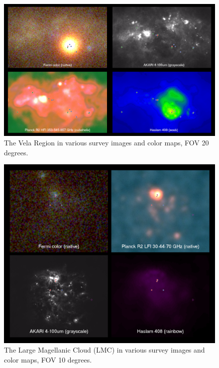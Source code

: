 \begin{figure}[tb]
  \centerline{\includegraphics[width=\textwidth]{figures/vela_region}}
  \caption{The Vela Region in various survey images and color maps, FOV 20 degrees.}
\end{figure}



\begin{figure}[tb]
  \centerline{\includegraphics[width=\textwidth]{figures/lmc_region}}
  \caption{The Large Magellanic Cloud (LMC) in various survey images and color maps, FOV 10 degrees.}
\end{figure}






